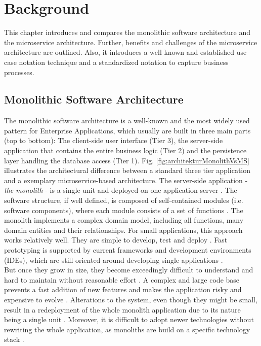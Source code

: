 \chapter{Background}
\label{ch:background}
This chapter introduces and compares the monolithic software architecture and the microservice architecture. Further, benefits and challenges of the microservice architecture are outlined. Also, it introduces a well known and established use case notation technique and a standardized notation to capture business processes.



\section{Monolithic Software Architecture}
\label{sec:background:monolith}
The monolithic software architecture is a well-known and the most widely used pattern for Enterprise Applications, which usually are built in three main parts (top to bottom): The client-side user interface (Tier 3), the server-side application that contains the entire business logic (Tier 2) and the persistence layer handling the database access (Tier 1). Fig. \ref{fig:architekturMonolithVsMS} illustrates the architectural difference between a standard three tier application and a exemplary microservice-based architecture. The server-side application - \textit{the monolith} - is a single unit and deployed on one application server \cite{infoq}. The software structure, if well defined, is composed of self-contained modules (i.e. software components), where each module consists of a set of functions \cite{HeuristicsAlwis}.
The monolith implements a complex domain model, including all functions, many domain entities and their relationships.
For small applications, this approach works relatively well. They are simple to develop, test and deploy \cite{FunctionalDecompositionHeinrich}. Fast prototyping is supported by current frameworks and development environments (IDEs), which are still oriented around developing single applications \cite{infoq}.
\\
But once they grow in size, they become exceedingly difficult to understand and hard to maintain without reasonable effort \cite{FunctionalDecompositionHeinrich} \cite{ClassificationOfRefactoring}. A complex and large code base prevents a fast addition of new features and makes the application risky and expensive to evolve \cite{TowardsTechnique}.
Alterations to the system, even though they might be small, result in a redeployment of the whole monolith application due to its nature being a single unit \cite{FunctionalDecompositionHeinrich}. Moreover, it is difficult to adopt newer technologies without rewriting the whole application, as monoliths are build on a specific technology stack \cite{infoq} \cite{ExtractionMazlami}.\\
